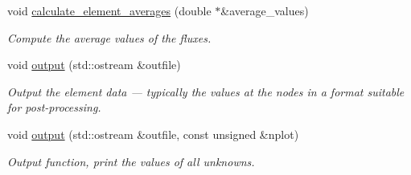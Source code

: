 \begin{DoxyCompactItemize}
void \hyperlink{classoomph_1_1FluxTransportEquations_a76f71716bef2734cadcd5f79a9d8e469}{calculate\+\_\+element\+\_\+averages} (double $\ast$\&average\+\_\+values)
\begin{DoxyCompactList}\small\item\em Compute the average values of the fluxes. \end{DoxyCompactList}\item 
void \hyperlink{classoomph_1_1FluxTransportEquations_afd690f82a24bc20b686fc7d25a59f775}{output} (std\+::ostream \&outfile)
\begin{DoxyCompactList}\small\item\em Output the element data --- typically the values at the nodes in a format suitable for post-\/processing. \end{DoxyCompactList}\item 
void \hyperlink{classoomph_1_1FluxTransportEquations_a6b9ea1eb9feb8c71c1d935c52e7d896f}{output} (std\+::ostream \&outfile, const unsigned \&nplot)
\begin{DoxyCompactList}\small\item\em Output function, print the values of all unknowns. \end{DoxyCompactList}\end{DoxyCompactItemize}
